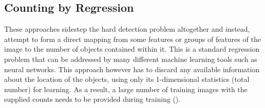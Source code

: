 \subsection{Counting by Regression}
These approaches sidestep the hard detection problem altogether and instead, attempt to form a direct mapping from some features or groups of features of the image to the number of objects contained within it. This is a standard regression problem that can be addressed by many different machine learning tools such as neural networks. This approach however has to discard any available information about the location of the objects, using only its 1-dimensional statistics (total number) for learning. As a result, a large number of training images with the supplied counts needs to be provided during training (\cite{REF18}).


\bigskip

\goodbreak
